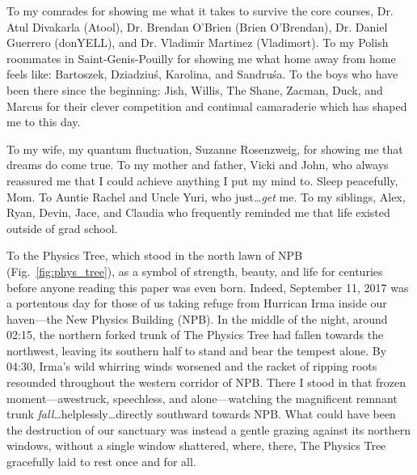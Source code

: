 To my comrades for showing me what it takes to survive the core courses, Dr. Atul Divakarla (Atool), Dr. Brendan O'Brien (Brien O'Brendan), Dr. Daniel Guerrero (donYELL), and Dr. Vladimir Martinez (Vladimort).
To my Polish roommates in Saint-Genis-Pouilly for showing me what home away from home feels like: Bartoszek, Dziadziuś, Karolina, and Sandruśa.
To the boys who have been there since the beginning: Jish, Willis, The Shane, Zacman, Duck, and Marcus for their clever competition and continual camaraderie which has shaped me to this day.

To my wife, my quantum fluctuation, Suzanne Rosenzweig, for showing me that dreams do come true.
To my mother and father, Vicki and John, who always reassured me that I could achieve anything I put my mind to. Sleep peacefully, Mom.
To Auntie Rachel and Uncle Yuri, who just\ldots \emph{get} me. %
To my siblings, Alex, Ryan, Devin, Jace, and Claudia who frequently reminded me that life existed outside of grad school.


To the Physics Tree, which stood in the north lawn of NPB (Fig.~\ref{fig:phys_tree}), as a symbol of strength, beauty, and life for centuries before anyone reading this paper was even born.
Indeed, September 11, 2017 was a portentous day for those of us taking refuge from Hurrican Irma inside our haven---the New Physics Building (NPB).
In the middle of the night, around 02:15, the northern forked trunk of The Physics Tree had fallen towards the northwest, leaving its southern half to stand and bear the tempest alone.
By 04:30, Irma's wild whirring winds worsened and the racket of ripping roots resounded throughout the western corridor of NPB.
There I stood in that frozen moment---awestruck, speechless, and alone---watching the magnificent remnant trunk \emph{fall}\ldots helplessly\ldots directly southward towards NPB.
What could have been the destruction of our sanctuary was instead a gentle grazing against its northern windows, without a single window shattered, where, there, The Physics Tree gracefully laid to rest once and for all.

